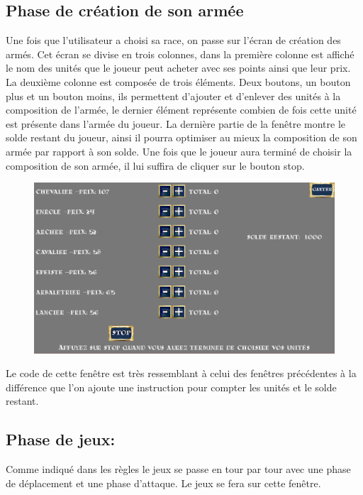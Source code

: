 \documentclass{article}
\begin{document}
 \subsection{Phase de création de son armée }
		Une fois que l'utilisateur a choisi sa race, on passe sur l'écran de création des armés. Cet écran se divise en trois colonnes, dans la première colonne est affiché le nom des unités que le joueur peut acheter avec ses points ainsi que leur prix. La deuxième colonne est composée de trois éléments. Deux boutons, un bouton plus et un bouton moins, ils permettent d'ajouter et d'enlever des unités à la composition de l'armée, le dernier élément représente combien de fois cette unité est présente dans l'armée du joueur. La dernière partie de la fenêtre montre le solde restant du joueur, ainsi il pourra optimiser au mieux la composition de son armée par rapport à son solde. Une fois que le joueur aura terminé de choisir la composition de son armée, il lui suffira de cliquer sur le bouton stop.
		
	\begin{figure}[h]
	\center
	\includegraphics[scale=0.15]{../images/GUIcompo.png}
  	\end{figure}

		Le code de cette fenêtre est très ressemblant à celui des fenêtres précédentes à la différence que l'on ajoute une instruction pour compter les unités et le solde restant.
		
 \subsection{Phase de jeux: }
	Comme indiqué dans les règles le jeux se passe en tour par tour avec une phase de déplacement et une phase d'attaque. Le jeux se fera sur cette fenêtre.
	
\end{document}
